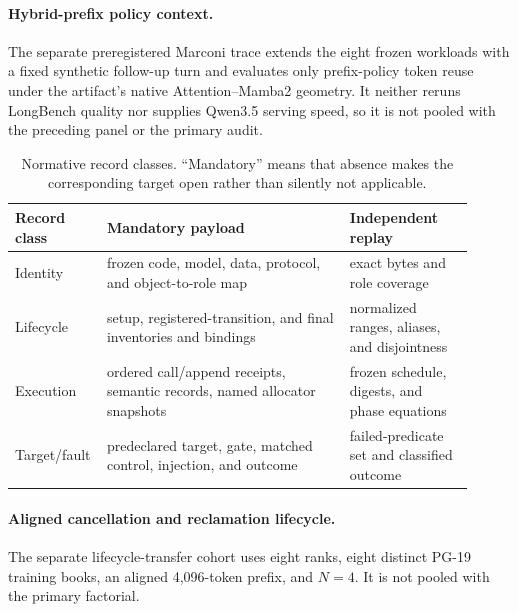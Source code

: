 \documentclass{article}
\begin{document}
\paragraph{Hybrid-prefix policy context.}
The separate preregistered Marconi trace extends the eight frozen workloads
with a fixed synthetic follow-up turn and evaluates only prefix-policy token
reuse under the artifact's native Attention--Mamba2 geometry.  It neither
reruns LongBench quality nor supplies Qwen3.5 serving speed, so it is not
pooled with the preceding panel or the primary audit.


\begin{table}[H]
  \caption{Normative record classes.  ``Mandatory'' means that absence makes
  the corresponding target open rather than silently not applicable.}
  \label{tab:normative-records}
  \centering\footnotesize
  \begin{tabular}{@{}p{0.14\linewidth}p{0.51\linewidth}p{0.26\linewidth}@{}}
    \toprule
    Record class & Mandatory payload & Independent replay \tabularnewline
    \midrule
    Identity & frozen code, model, data, protocol, and object-to-role map & exact bytes and role coverage \\
    Lifecycle & setup, registered-transition, and final inventories and bindings & normalized ranges, aliases, and disjointness \\
    Execution & ordered call/append receipts, semantic records, named allocator snapshots & frozen schedule, digests, and phase equations \\
    Target/fault & predeclared target, gate, matched control, injection, and outcome & failed-predicate set and classified outcome \\
    \bottomrule
  \end{tabular}
\end{table}

\paragraph{Aligned cancellation and reclamation lifecycle.}
The separate lifecycle-transfer cohort uses eight ranks, eight distinct PG-19
training books, an aligned 4,096-token prefix, and $N=4$.  It is not pooled
with the primary factorial.
\end{document}
